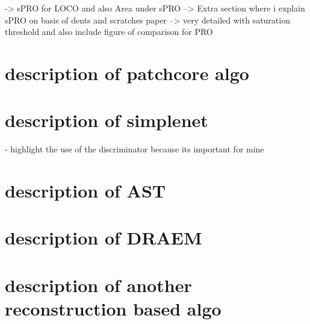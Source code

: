 -> sPRO for LOCO and also Area under sPRO
--> Extra section where i explain sPRO on basis of dents and scratches paper
--> very detailed with saturation threshold and also include figure of comparison for PRO




\section{description of patchcore algo}


\section{description of simplenet}
- highlight the use of the discriminator because its important for mine

\section{description of AST}

\section{description of DRAEM}

\section{description of another reconstruction based algo}
















